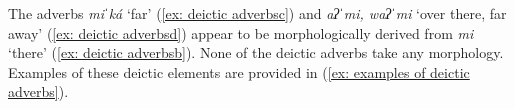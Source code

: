     \label{ex: deictic adverbsa}
        \label{ex: deictic adverbsb}
            \label{ex: deictic adverbsc}
                \label{ex: deictic adverbsd}
                    \label{ex: deictic adverbse}
                    \label{ex: deictic adverbsf}
                        \label{ex: deictic adverbsg}
                        \label{ex: deictic adverbsh}
    \z
\z

The adverbs \textit{miˈká} `far' (\ref{ex: deictic adverbsc}) and \textit{aʔˈmi, waʔˈmi} `over there, far away' (\ref{ex: deictic adverbsd}) appear to be morphologically derived from \textit{mi} `there' (\ref{ex: deictic adverbsb}). None of the deictic adverbs take any morphology. Examples of these deictic elements are provided in (\ref{ex: examples of deictic adverbs}).

\ea\label{ex: examples of deictic adverbs}

